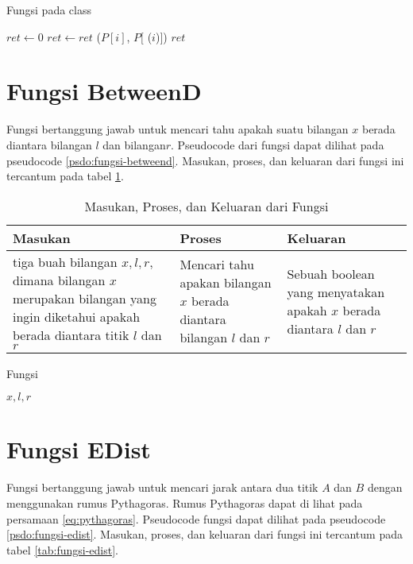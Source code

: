 \begin{algorithm}
    \caption{Fungsi  pada class }
	\label{psdo:class-polygon-perimeter}
    \begin{algorithmic}[1]
        \State $ret \leftarrow 0$
            \State $ret \leftarrow ret $ ($P[i]$, $P[$ ($i$)$] $)
        \EndFor
        \State \Return $ret$
	\end{algorithmic}
\end{algorithm}
\newpage
\section{Fungsi BetweenD}
Fungsi  bertanggung jawab untuk mencari tahu apakah suatu bilangan $x$ berada diantara bilangan $l$ dan bilangan$r$. Pseudocode dari fungsi  dapat dilihat pada pseudocode \ref{psdo:fungsi-betweend}. Masukan, proses, dan keluaran dari fungsi ini tercantum pada tabel \ref{tab:fungsi-betweend}.

\begin{table}[]
	\Centering
	\begin{tabular}{|p{3cm}|p{3cm}|p{3cm}|}
	\hline
	Masukan   & Proses     & Keluaran \\ \hline
	tiga buah bilangan $x,l,r$, dimana bilangan $x$ merupakan bilangan yang ingin diketahui apakah berada diantara titik $l$ dan $r$ & Mencari tahu apakan bilangan $x$ berada diantara bilangan $l$ dan $r$ &   Sebuah boolean yang menyatakan apakah $x$ berada diantara $l$ dan $r$     \\ \hline
	\end{tabular}
	\caption{Masukan, Proses, dan Keluaran dari Fungsi  }
	\label{tab:fungsi-betweend}
\end{table}
\begin{algorithm}
    \caption{Fungsi }
	\label{psdo:fungsi-betweend}
    \begin{algorithmic}[1]
        \Require $x, l, r$
            \State \Return {}
        \Else
            \State \Return {}
        \EndIf
	\end{algorithmic}
\end{algorithm}

\newpage
\section{Fungsi EDist}
Fungsi  bertanggung jawab untuk mencari jarak antara dua titik  $A$ dan  $B$ dengan menggunakan rumus Pythagoras. Rumus Pythagoras dapat di lihat pada persamaan \ref{eq:pythagoras}. Pseudocode fungsi  dapat dilihat pada pseudocode \ref{psdo:fungsi-edist}. Masukan, proses, dan keluaran dari fungsi ini tercantum pada tabel \ref{tab:fungsi-edist}.

